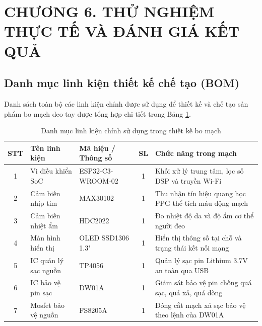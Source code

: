 \section*{CHƯƠNG 6. THỬ NGHIỆM THỰC TẾ VÀ ĐÁNH GIÁ KẾT QUẢ}
\setcounter{section}{6}
\setcounter{subsection}{0}
\setcounter{figure}{0}
\setcounter{table}{0}

\subsection{Danh mục linh kiện thiết kế chế tạo (BOM)}
Danh sách toàn bộ các linh kiện chính được sử dụng để thiết kế và chế tạo sản phẩm bo mạch đeo tay được tổng hợp chi tiết trong Bảng \ref{tab:bom_linhkien_detail}.

\begin{table}[H]
    \centering
    \caption{Danh mục linh kiện chính sử dụng trong thiết kế bo mạch}
    \label{tab:bom_linhkien_detail}
    \fontsize{11pt}{14pt}\selectfont
    \renewcommand{\baselinestretch}{1.15}
    \renewcommand{\arraystretch}{1.15}
    \begin{tabularx}{\textwidth}{|c|X|X|c|X|}
        \hline
        \textbf{STT} & \textbf{Tên linh kiện} & \textbf{Mã hiệu / Thông số} & \textbf{SL} & \textbf{Chức năng trong mạch} \\ \hline
        1 & Vi điều khiển SoC & ESP32-C3-WROOM-02 & 1 & Khối xử lý trung tâm, lọc số DSP và truyền Wi-Fi \\ \hline
        2 & Cảm biến nhịp tim & MAX30102 & 1 & Thu nhận tín hiệu quang học PPG thể tích máu động mạch \\ \hline
        3 & Cảm biến nhiệt ẩm & HDC2022 & 1 & Đo nhiệt độ da và độ ẩm cơ thể người đeo \\ \hline
        4 & Màn hình hiển thị & OLED SSD1306 1.3" & 1 & Hiển thị thông số tại chỗ và trạng thái kết nối mạng \\ \hline
        5 & IC quản lý sạc nguồn & TP4056 & 1 & Quản lý sạc pin Lithium 3.7V an toàn qua USB \\ \hline
        6 & IC bảo vệ pin sạc & DW01A & 1 & Giám sát bảo vệ pin chống quá sạc, quá xả, quá dòng \\ \hline
        7 & Mosfet bảo vệ nguồn & FS8205A & 1 & Đóng cắt mạch xả sạc bảo vệ theo lệnh của DW01A \\ \hline
    \end{tabularx}
\end{table}

